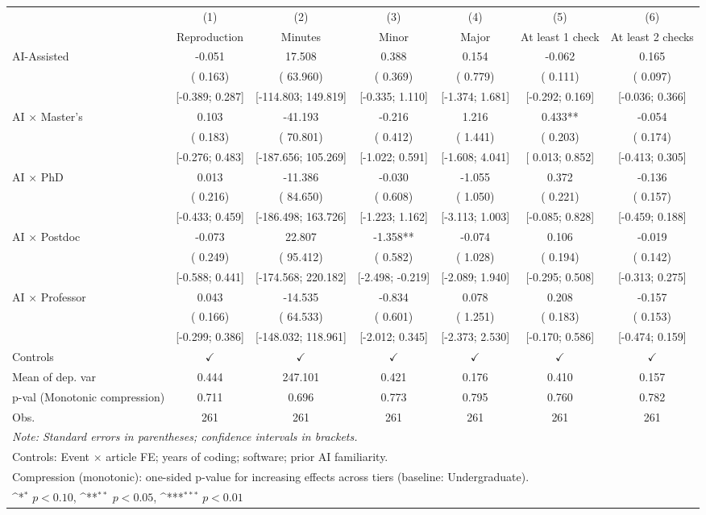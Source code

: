 \def\sym#1{\ifmmode^{#1}\else\(^{#1}\)\fi}
\begin{tabular}{l*{6}{c}}
\hline\hline
 & (1) & (2) & (3) & (4) & (5) & (6)
\\
 & Reproduction & Minutes & Minor & Major & At least 1 check & At least 2 checks
 \\
\hline
AI-Assisted & -0.051 &  17.508 &  0.388 &  0.154 & -0.062 &  0.165
\\
 & ( 0.163) & ( 63.960) & ( 0.369) & ( 0.779) & ( 0.111) & ( 0.097)
\\
 & [-0.389;  0.287] & [-114.803;  149.819] & [-0.335;  1.110] & [-1.374;  1.681] & [-0.292;  0.169] & [-0.036;  0.366]
\\
AI × Master's &  0.103 & -41.193 & -0.216 &  1.216 &  0.433** & -0.054
\\
 & ( 0.183) & ( 70.801) & ( 0.412) & ( 1.441) & ( 0.203) & ( 0.174)
\\
 & [-0.276;  0.483] & [-187.656;  105.269] & [-1.022;  0.591] & [-1.608;  4.041] & [ 0.013;  0.852] & [-0.413;  0.305]
\\
AI × PhD &  0.013 & -11.386 & -0.030 & -1.055 &  0.372 & -0.136
\\
 & ( 0.216) & ( 84.650) & ( 0.608) & ( 1.050) & ( 0.221) & ( 0.157)
\\
 & [-0.433;  0.459] & [-186.498;  163.726] & [-1.223;  1.162] & [-3.113;  1.003] & [-0.085;  0.828] & [-0.459;  0.188]
\\
AI × Postdoc & -0.073 &  22.807 & -1.358** & -0.074 &  0.106 & -0.019
\\
 & ( 0.249) & ( 95.412) & ( 0.582) & ( 1.028) & ( 0.194) & ( 0.142)
\\
 & [-0.588;  0.441] & [-174.568;  220.182] & [-2.498; -0.219] & [-2.089;  1.940] & [-0.295;  0.508] & [-0.313;  0.275]
\\
AI × Professor &  0.043 & -14.535 & -0.834 &  0.078 &  0.208 & -0.157
\\
 & ( 0.166) & ( 64.533) & ( 0.601) & ( 1.251) & ( 0.183) & ( 0.153)
\\
 & [-0.299;  0.386] & [-148.032;  118.961] & [-2.012;  0.345] & [-2.373;  2.530] & [-0.170;  0.586] & [-0.474;  0.159]
\\
\hline
Controls & $\checkmark$ & $\checkmark$ & $\checkmark$ & $\checkmark$ & $\checkmark$ & $\checkmark$
\\
Mean of dep. var &  0.444 &  247.101 &  0.421 &  0.176 &  0.410 &  0.157
\\
p-val (Monotonic compression) &  0.711 &  0.696 &  0.773 &  0.795 &  0.760 &  0.782
\\
Obs. & 261 & 261 & 261 & 261 & 261 & 261
\\
\hline
\hline\hline
\multicolumn{7}{l}{\it{Note:} Standard errors in parentheses; confidence intervals in brackets.}\\
\multicolumn{7}{l}{Controls: Event $\times$ article FE; years of coding; software; prior AI familiarity.}\\
\multicolumn{7}{l}{Compression (monotonic): one-sided p-value for increasing effects across tiers (baseline: Undergraduate).}\\
\multicolumn{7}{l}{\sym{*} $p<0.10$, \sym{**} $p<0.05$,  \sym{***} $p<0.01$}\\
\end{tabular}
